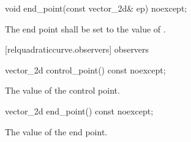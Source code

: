 \begin{itemdecl}
    void end_point(const vector_2d& ep) noexcept;
\end{itemdecl}
\begin{itemdescr}
	\pnum
	\effects
	The end point shall be set to the value of .
\end{itemdescr}

 [relquadraticcurve.observers]{ observers}

\begin{itemdecl}
    vector_2d control_point() const noexcept;
\end{itemdecl}
\begin{itemdescr}
	\pnum
	\returns
	The value of the control point.
\end{itemdescr}

\begin{itemdecl}
    vector_2d end_point() const noexcept;
\end{itemdecl}
\begin{itemdescr}
	\pnum
	\returns
	The value of the end point.
\end{itemdescr}
